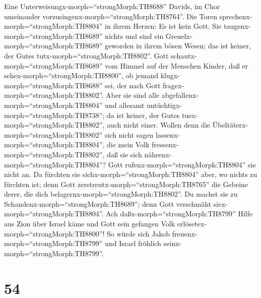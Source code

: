  Eine Unterweisungx-morph=``strongMorph:TH8688'' Davids, im
Chor umeinander vorzusingenx-morph=``strongMorph:TH8764''. Die Toren
sprechenx-morph=``strongMorph:TH8804'' in ihrem Herzen: Es ist kein
Gott. Sie taugenx-morph=``strongMorph:TH8689'' nichts und sind ein
Greuelx-morph=``strongMorph:TH8689'' geworden in ihrem bösen Wesen; das
ist keiner, der Gutes tutx-morph=``strongMorph:TH8802''. 
Gott schautx-morph=``strongMorph:TH8689'' vom Himmel auf der Menschen
Kinder, daß er sehex-morph=``strongMorph:TH8800'', ob jemand
klugx-morph=``strongMorph:TH8688'' sei, der nach Gott
fragex-morph=``strongMorph:TH8802''.  Aber sie sind alle
abgefallenx-morph=``strongMorph:TH8804'' und allesamt
untüchtigx-morph=``strongMorph:TH8738''; da ist keiner, der Gutes
tuex-morph=``strongMorph:TH8802'', auch nicht einer.  Wollen
denn die Übeltäterx-morph=``strongMorph:TH8802'' sich nicht sagen
lassenx-morph=``strongMorph:TH8804'', die mein Volk
fressenx-morph=``strongMorph:TH8802'', daß sie sich
nährenx-morph=``strongMorph:TH8804''? Gott
rufenx-morph=``strongMorph:TH8804'' sie nicht an.  Da
fürchten sie sichx-morph=``strongMorph:TH8804'' aber, wo nichts zu
fürchten ist; denn Gott zerstreutx-morph=``strongMorph:TH8765'' die
Gebeine derer, die dich belagernx-morph=``strongMorph:TH8802''. Du
machst sie zu Schandenx-morph=``strongMorph:TH8689''; denn Gott
verschmäht siex-morph=``strongMorph:TH8804''.  Ach
daßx-morph=``strongMorph:TH8799'' Hilfe aus Zion über Israel käme und
Gott sein gefangen Volk erlösetex-morph=``strongMorph:TH8800''! So würde
sich Jakob freuenx-morph=``strongMorph:TH8799'' und Israel fröhlich
seinx-morph=``strongMorph:TH8799''.

\hypertarget{section-53}{%
\section{54}\label{section-53}}

